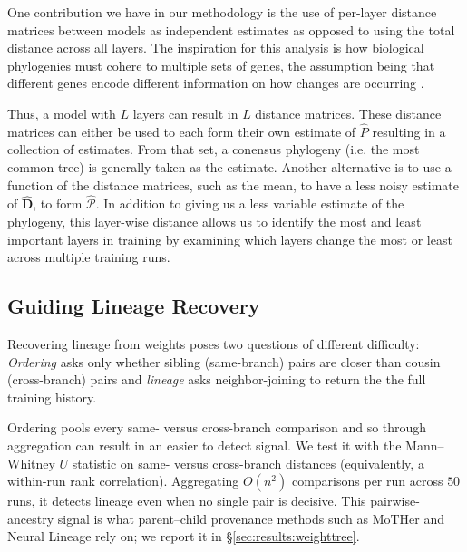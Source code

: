 \documentclass{article}
\theoremstyle{definition}
\theoremstyle{plain}
\begin{document}
One contribution we have in our methodology is the use of per-layer distance matrices between models as independent estimates as opposed to using the total distance across all layers.  The inspiration for this analysis is how biological phylogenies must cohere to multiple sets of genes, the assumption being that different genes encode different information on how changes are occurring \cite{maddison1997gene}.

Thus, a model with $L$ layers can result in $L$ distance matrices.  These distance matrices can either be used to each form their own estimate of $\hat{P}$ resulting in a collection of estimates.  From that set, a conensus phylogeny (i.e. the most common tree) is generally taken as the estimate.  Another alternative is to use a function of the distance matrices, such as the mean, to have a less noisy estimate of $\hat{\textbf{D}}$, to form $\widehat{\mathcal{P}}$. In addition to giving us a less variable estimate of the phylogeny, this layer-wise distance allows us to identify the most and least important layers in training by examining which layers change the most or least across multiple training runs.


\subsection{Guiding Lineage Recovery}
\label{sec:framework:theory}

Recovering lineage from weights poses two questions of different difficulty: \emph{Ordering} asks only whether sibling (same-branch) pairs are closer
than cousin (cross-branch) pairs and \emph{lineage} asks neighbor-joining to return the the full training history.

 Ordering pools every same- versus cross-branch comparison and so through aggregation can result in an easier to detect signal. We test it with the Mann--Whitney $U$ statistic on same- versus cross-branch
distances (equivalently, a within-run rank correlation).  Aggregating
$O(n^2)$ comparisons per run across $50$ runs, it detects lineage even when no single pair is decisive.
This pairwise-ancestry signal is what parent--child provenance methods such as MoTHer
\citep{horwitz2024mother} and Neural Lineage \citep{yu2024neurallineage} rely on; we report it in
\S\ref{sec:results:weighttree}.
\end{document}
